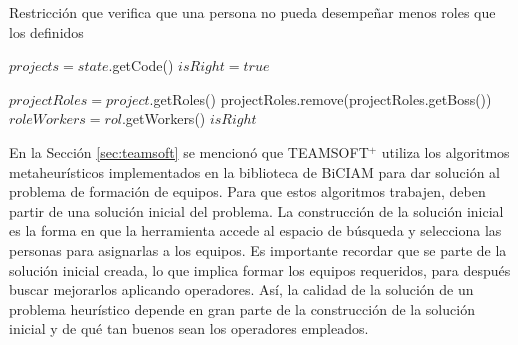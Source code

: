 \begin{algorithm}[H]
	\caption{Restricción que verifica que una persona no pueda desempeñar menos roles que los definidos}
	\label{alg:rest-min-roles}
	$projects = state$.getCode()\;
	$isRight = true$\;
	
	{$projectRoles = project$.getRoles() 
		projectRoles.remove(projectRoles.getBoss()) 
		{
			$roleWorkers = rol$.getWorkers() 
			{
			}
			 \Break
		}
		 \Break
	}
	\Return $isRight$
\end{algorithm} \vspace{1cm}

En la Sección \ref{sec:teamsoft} se mencionó que TEAMSOFT$^+$ utiliza los algoritmos metaheurísticos implementados en la biblioteca de  BiCIAM para dar solución al problema de formación de equipos. Para que estos algoritmos trabajen, deben partir de una solución inicial del problema. La construcción de la solución inicial es la forma en que la herramienta accede al espacio de búsqueda y selecciona las personas para asignarlas a los equipos. Es importante recordar que se parte de la solución inicial creada, lo que implica formar los equipos requeridos, para después buscar mejorarlos aplicando operadores. Así, la calidad de la solución de un problema heurístico depende en gran parte de la construcción de la solución inicial y de qué tan buenos sean los operadores empleados.\\


